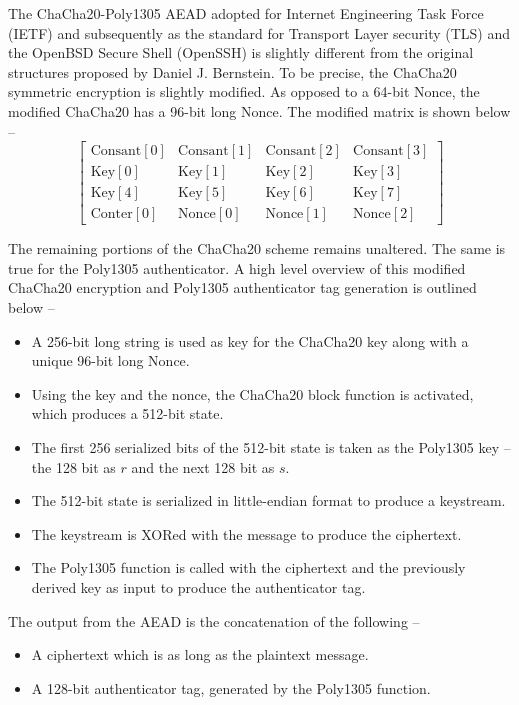 \documentclass{article}
\begin{document}
The ChaCha20-Poly1305 AEAD adopted for Internet Engineering Task Force (IETF) \cite{rfc8439} and subsequently as the standard for Transport Layer security (TLS) \cite{rfc7905} and the OpenBSD Secure Shell (OpenSSH) \cite{miller2015chacha20} is slightly different from the original structures proposed by Daniel J. Bernstein. To be precise, the ChaCha20 symmetric encryption is slightly modified. As opposed to a 64-bit Nonce, the modified ChaCha20 has a 96-bit long Nonce. The modified matrix is shown below --
\begin{equation}\label{initialStateMod}
    \left[
        \begin{array}{cccc}
            \text{Consant}[0] & \text{Consant}[1] & \text{Consant}[2] & \text{Consant}[3] \\
            \text{Key}[0]     & \text{Key}[1]     & \text{Key}[2]     & \text{Key}[3]     \\
            \text{Key}[4]     & \text{Key}[5]     & \text{Key}[6]     & \text{Key}[7]     \\
            \text{Conter}[0]  & \text{Nonce}[0]   & \text{Nonce}[1]   & \text{Nonce}[2]
        \end{array}
        \right]
\end{equation}

The remaining portions of the ChaCha20 scheme remains unaltered. The same is true for the Poly1305 authenticator. A high level overview of this modified ChaCha20 encryption and Poly1305 authenticator tag generation is outlined below --
\begin{itemize}
    \item A 256-bit long string is used as key for the ChaCha20 key along with a unique 96-bit long Nonce.
    \item Using the key and the nonce, the ChaCha20 block function is activated, which produces a 512-bit state.
    \item The first 256 serialized bits of the 512-bit state is taken as the Poly1305 key -- the 128 bit as $r$ and the next 128 bit as $s$.
    \item The 512-bit state is serialized in little-endian format to produce a keystream.
    \item The keystream is XORed with the message to produce the ciphertext.
    \item The Poly1305 function is called with the ciphertext and the previously derived key as input to produce the authenticator tag.
\end{itemize}
The output from the AEAD is the concatenation of the following --
\begin{itemize}
    \item A ciphertext which is as long as the plaintext message.
    \item A 128-bit authenticator tag, generated by the Poly1305 function.
\end{itemize}
\end{document}
